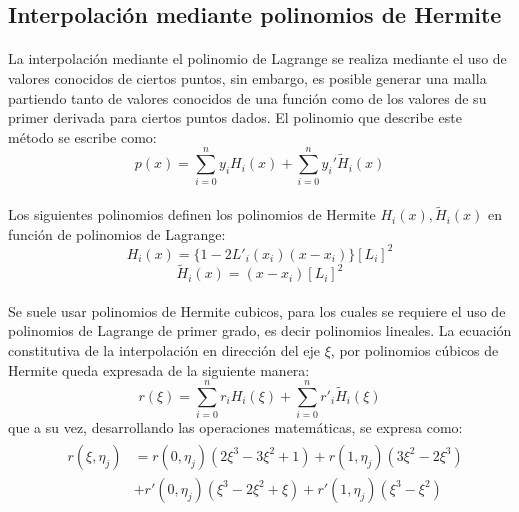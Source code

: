 \documentclass[letterpaper, openright, 12pt]{book}
\begin{document}
		\subsection{Interpolación mediante polinomios de Hermite}
			\paragraph*{}
				La interpolación mediante el polinomio de Lagrange se realiza mediante el uso de valores conocidos de ciertos puntos, sin embargo, es posible generar una malla partiendo tanto de valores conocidos de una función como de los valores de su primer derivada para ciertos puntos dados. El polinomio que describe este método se escribe como:
				\begin{equation}
					p(x) = \sum_{i = 0}^{n} y_{i}H_{i}(x) + \sum_{i = 0}^{n}y_{i}\prime \widetilde{H}_{i}(x)
				\end{equation}
			
			\paragraph*{}
				Los siguientes polinomios definen los polinomios de Hermite $H_{i}(x), \widetilde{H}_{i}(x)$ en función de polinomios de Lagrange:
				\begin{equation}
					H_{i}(x) = \{  1 - 2L\prime_{i}(x_{i})(x - x_{i})  \} \left[L_{i}\right]^2
				\end{equation}
				\begin{equation}
					\widetilde{H}_{i}(x) = (x - x_{i}) \left[L_{i}\right] ^ 2
				\end{equation}
			\paragraph*{}
				Se suele usar polinomios de Hermite cubicos, para los cuales se requiere el uso de polinomios de Lagrange de primer grado, es decir polinomios lineales. La ecuación constitutiva de la interpolación en dirección del eje $\xi$, por polinomios cúbicos de Hermite queda expresada de la siguiente manera:
				\begin{equation}
					r(\xi) = \sum_{i = 0}^{n} r_{i}H_{i}(\xi) + \sum_{i = 0}^{n} r\prime_{i}\widetilde{H}_{i}(\xi)
				\end{equation}
				que a su vez, desarrollando las operaciones matemáticas, se expresa como:
				\begin{align}
					&\begin{aligned}
						r(\xi, \eta_{j}) &= r(0, \eta_{j})(2\xi^3 - 3\xi^2 +1) + r(1, \eta_{j})(3\xi^2 - 2\xi^3) \\ &+ r\prime(0, \eta_{j})(\xi^3 - 2\xi^2 + \xi) + r\prime(1, \eta_{j})(\xi^3 - \xi^2)
					\end{aligned}
				\end{align}
				
\end{document}
